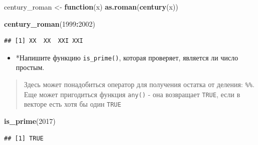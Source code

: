 \documentclass[]{book}
\newenvironment{Shaded}{\begin{snugshade}}{\end{snugshade}}
\newcommand{\KeywordTok}[1]{\textcolor[rgb]{0.13,0.29,0.53}{\textbf{#1}}}
\newcommand{\DecValTok}[1]{\textcolor[rgb]{0.00,0.00,0.81}{#1}}
\newcommand{\StringTok}[1]{\textcolor[rgb]{0.31,0.60,0.02}{#1}}
\newcommand{\ControlFlowTok}[1]{\textcolor[rgb]{0.13,0.29,0.53}{\textbf{#1}}}
\newcommand{\OperatorTok}[1]{\textcolor[rgb]{0.81,0.36,0.00}{\textbf{#1}}}
\newcommand{\NormalTok}[1]{#1}
\providecommand{\tightlist}{%
  \setlength{\itemsep}{0pt}\setlength{\parskip}{0pt}}
\begin{document}
\begin{Shaded}
\begin{Highlighting}[]
\NormalTok{century_roman <-}\StringTok{ }\ControlFlowTok{function}\NormalTok{(x) }\KeywordTok{as.roman}\NormalTok{(}\KeywordTok{century}\NormalTok{(x))}
\end{Highlighting}
\end{Shaded}

\begin{Shaded}
\begin{Highlighting}[]
\KeywordTok{century_roman}\NormalTok{(}\DecValTok{1999}\OperatorTok{:}\DecValTok{2002}\NormalTok{)}
\end{Highlighting}
\end{Shaded}

\begin{verbatim}
## [1] XX  XX  XXI XXI
\end{verbatim}

\begin{itemize}
\tightlist
\item
  *Напишите функцию \texttt{is\_prime()}, которая проверяет, является ли
  число простым.
\end{itemize}

\begin{quote}
Здесь может понадобиться оператор для получения остатка от деления:
\texttt{\%\%}. Еще может пригодиться функция \texttt{any()} - она
возвращает \texttt{TRUE}, если в векторе есть хотя бы один \texttt{TRUE}
\end{quote}

\begin{Shaded}
\end{Shaded}

\begin{Shaded}
\begin{Highlighting}[]
\KeywordTok{is_prime}\NormalTok{(}\DecValTok{2017}\NormalTok{)}
\end{Highlighting}
\end{Shaded}

\begin{verbatim}
## [1] TRUE
\end{verbatim}
\end{document}
